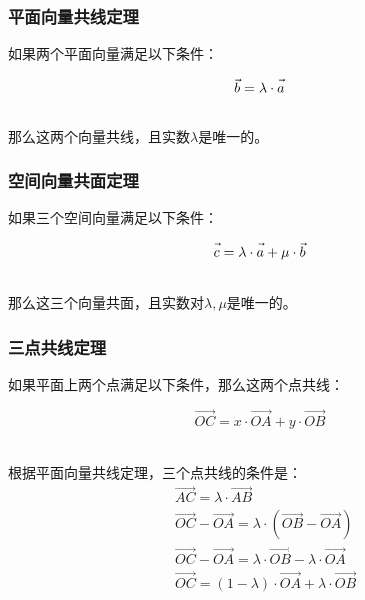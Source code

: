 \documentclass[UTF8]{ctexart}
\let\nvec\vec
\def\vec#1{\nvec{\vphantom b\smash{#1}}}
\begin{document}
\subsubsection{平面向量共线定理}
    如果两个平面向量满足以下条件：
    \begin{large}
        \begin{equation*}
            \vec{b}=\lambda\cdot \vec{a}
        \end{equation*}
    \end{large}\\
    那么这两个向量共线，且实数$\lambda$是唯一的。\\

\subsubsection{空间向量共面定理}
    如果三个空间向量满足以下条件：
    \begin{large}
        \begin{equation*}
            \vec{c}=\lambda\cdot \vec{a}+\mu\cdot \vec{b}
        \end{equation*}
    \end{large}\\
    那么这三个向量共面，且实数对$\lambda,\mu$是唯一的。

\newpage

\subsubsection{三点共线定理}
    如果平面上两个点满足以下条件，那么这两个点共线：
    \begin{large}
        \begin{equation*}
            \overrightarrow{OC}=x\cdot\overrightarrow{OA}+y\cdot\overrightarrow{OB}
        \end{equation*}
    \end{large}\\
    根据平面向量共线定理，三个点共线的条件是：\vspace{3pt}
    \setcounter{equation}{0}
    \begin{align}
        &\overrightarrow{AC}=\lambda\cdot\overrightarrow{AB}\\[3mm]
        &\overrightarrow{OC}-\overrightarrow{OA}=\lambda\cdot\left(\overrightarrow{OB}-\overrightarrow{OA}\right)\\[3mm]
        &\overrightarrow{OC}-\overrightarrow{OA}=\lambda\cdot\overrightarrow{OB}-\lambda\cdot\overrightarrow{OA}\\[3mm]
        &\overrightarrow{OC}=(1-\lambda)\cdot\overrightarrow{OA}+\lambda\cdot\overrightarrow{OB}
    \end{align}\\
    
\end{document}
